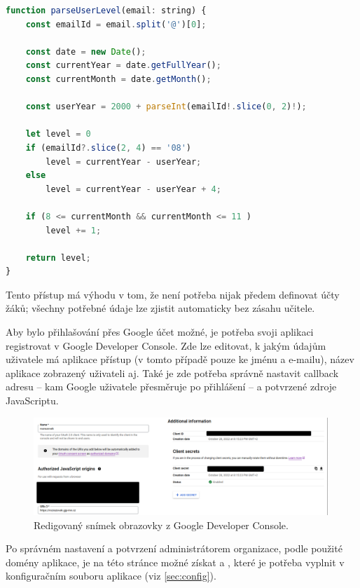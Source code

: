 \begin{lstlisting}[language=JavaScript,caption={Úryvek \M{/src/pages/api/auth/[...nextauth].ts}; zjištění aktuálního ročníku uživatele.}]
function parseUserLevel(email: string) {
    const emailId = email.split('@')[0];
    
    const date = new Date();
    const currentYear = date.getFullYear();
    const currentMonth = date.getMonth();
    
    const userYear = 2000 + parseInt(emailId!.slice(0, 2)!);
    
    let level = 0
    if (emailId?.slice(2, 4) == '08')
        level = currentYear - userYear;
    else
        level = currentYear - userYear + 4;
    
    if (8 <= currentMonth && currentMonth <= 11 )
        level += 1;
    
    return level;
}
\end{lstlisting}

Tento přístup má výhodu v tom, že není potřeba nijak předem definovat účty žáků; všechny potřebné údaje lze zjistit automaticky bez zásahu učitele.

Aby bylo přihlašování přes Google účet možné, je potřeba svoji aplikaci registrovat v Google Developer Console. Zde lze editovat, k jakým údajům uživatele má aplikace přístup (v tomto případě pouze ke jménu a e-mailu), název aplikace zobrazený uživateli aj. Také je zde potřeba správně nastavit callback adresu -- kam Google uživatele přesměruje po přihlášení -- a potvrzené zdroje JavaScriptu.

\begin{figure}[H]
    \centering
    \includegraphics[width=420px]{images/02technologie/google-console.png}
    \caption{Redigovaný snímek obrazovky z Google Developer Console.}
\end{figure}

Po správném nastavení a potvrzení administrátorem organizace, podle použité domény aplikace, je na této stránce možné získat  a , které je potřeba vyplnit v konfiguračním souboru aplikace (viz \ref{sec:config}).


